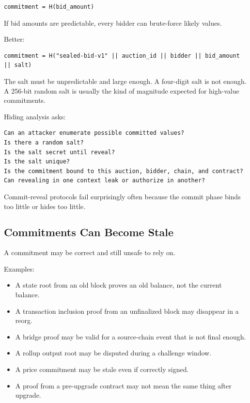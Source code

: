 \begin{lstlisting}
commitment = H(bid_amount)
\end{lstlisting}

If bid amounts are predictable, every bidder can brute-force likely
values.

Better:

\begin{lstlisting}
commitment = H("sealed-bid-v1" || auction_id || bidder || bid_amount || salt)
\end{lstlisting}

The salt must be unpredictable and large enough. A four-digit salt is
not enough. A 256-bit random salt is usually the kind of magnitude
expected for high-value commitments.

Hiding analysis asks:

\begin{lstlisting}
Can an attacker enumerate possible committed values?
Is there a random salt?
Is the salt secret until reveal?
Is the salt unique?
Is the commitment bound to this auction, bidder, chain, and contract?
Can revealing in one context leak or authorize in another?
\end{lstlisting}

Commit-reveal protocols fail surprisingly often because the commit phase
binds too little or hides too little.

\subsection{Commitments Can Become Stale}

A commitment may be correct and still unsafe to rely on.

Examples:

\begin{itemize}
\tightlist
\item
  A state root from an old block proves an old balance, not the current
  balance.
\item
  A transaction inclusion proof from an unfinalized block may disappear
  in a reorg.
\item
  A bridge proof may be valid for a source-chain event that is not final
  enough.
\item
  A rollup output root may be disputed during a challenge window.
\item
  A price commitment may be stale even if correctly signed.
\item
  A proof from a pre-upgrade contract may not mean the same thing after
  upgrade.
\end{itemize}

